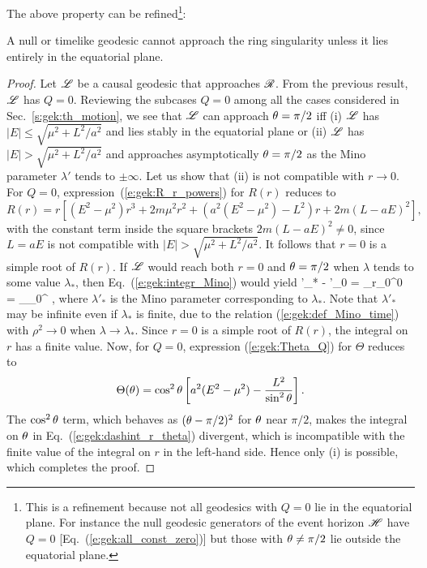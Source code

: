 The above property can be refined\footnote{This is a refinement because not all
geodesics with $Q=0$ lie in the equatorial plane. For instance the
null geodesic generators of the event horizon $\mathscr{H}$ have $Q=0$ [Eq.~(\ref{e:gek:all_const_zero})]
but those with $\theta\neq \pi/2$ lie outside the equatorial plane.}:
\begin{greybox}
A null or timelike geodesic cannot approach the ring singularity unless it lies
entirely in the equatorial plane.
\end{greybox}
\begin{proof}
Let $\mathscr{L}$ be a causal geodesic that approaches $\mathscr{R}$. From the previous result,
$\mathscr{L}$ has $Q=0$. Reviewing the subcases $Q=0$ among all the cases considered in
Sec.~\ref{s:gek:th_motion}, we see that $\mathscr{L}$ can approach $\theta=\pi/2$ iff
(i) $\mathscr{L}$ has
$|E|\leq \sqrt{\mu^2 + L^2/a^2}$ and lies stably in the equatorial plane
or (ii) $\mathscr{L}$ has $|E| > \sqrt{\mu^2 + L^2/a^2}$ and approaches asymptotically
$\theta=\pi/2$ as the Mino parameter $\lambda'$ tends to $\pm\infty$.
Let us show that (ii) is not compatible with $r\to 0$.
For $Q=0$, expression~(\ref{e:gek:R_r_powers}) for $R(r)$ reduces to
\[
 R(r) = r \left[ (E^2 - \mu^2) r^3 + 2 m \mu^2 r^2
     + \left( a^2(E^2 - \mu^2) - L^2 \right) r
     + 2m (L - a E)^2 \right] ,
\]
with the constant term inside the square brackets $2m(L - a E)^2 \neq 0$,
since $L=a E$ is not compatible with $|E| > \sqrt{\mu^2 + L^2/a^2}$. It
follows that $r=0$ is a simple root of $R(r)$. If $\mathscr{L}$ would reach both
$r=0$ and $\theta=\pi/2$ when $\lambda$ tends to some value $\lambda_*$,
then Eq.~(\ref{e:gek:integr_Mino}) would yield
\be \label{e:gek:dashint_r_theta}
    \lambda'_* - \lambda'_0 = \dashint_{r_0}^0 
    = \dashint_{\th_0}^{} \frac{\eps_\th \, \D \th}{\sqrt{\Theta(\th)}} ,
\ee
where $\lambda'_*$ is the Mino parameter corresponding to $\lambda_*$. Note that
$\lambda'_*$ may be infinite even if $\lambda_*$ is finite, due to the
relation (\ref{e:gek:def_Mino_time}) with $\rho^2\to 0$ when $\lambda\to\lambda_*$.
Since $r=0$ is a simple root of $R(r)$, the integral on $r$ has a finite value.
Now, for $Q=0$, expression (\ref{e:gek:Theta_Q}) for $\Theta$ reduces to
\[
    \Theta(\theta) = \cos^2\theta \left[ a^2 (E^2 - \mu^2)
    - \frac{L^2}{\sin^2\theta} \right] .
\]
The $\cos^2\theta$ term, which behaves as $(\theta - \pi/2)^2$ for $\theta$ near $\pi/2$,
makes the integral on $\theta$ in
Eq.~(\ref{e:gek:dashint_r_theta}) divergent, which is incompatible with the
finite value of the integral on $r$ in the left-hand side. Hence only (i) is possible, which completes
the proof.
\end{proof}

